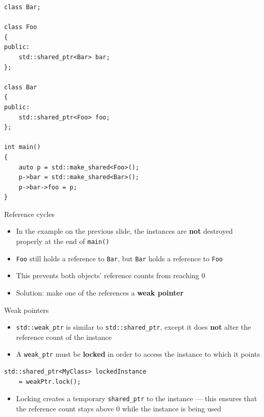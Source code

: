 \begin{frame}[fragile]
    \begin{lstlisting}
class Bar;

class Foo
{
public:
    std::shared_ptr<Bar> bar;
};

class Bar
{
public:
    std::shared_ptr<Foo> foo;
};

int main()
{
    auto p = std::make_shared<Foo>();
    p->bar = std::make_shared<Bar>();
    p->bar->foo = p;
}
    \end{lstlisting}
\end{frame}

\begin{frame}{Reference cycles}
    \begin{itemize}
        \item In the example on the previous slide,
            the instances are \textbf{not} destroyed properly at the end of \lstinline{main()} \pause
        \item \lstinline{Foo} still holds a reference to \lstinline{Bar},
            but \lstinline{Bar} holds a reference to \lstinline{Foo} \pause
        \item This prevents both objects' reference counts from reaching 0 \pause
        \item Solution: make one of the references a \textbf{weak pointer}
    \end{itemize}
\end{frame}

\begin{frame}[fragile]{Weak pointers}
    \begin{itemize}
        \item \lstinline{std::weak_ptr} is similar to \lstinline{std::shared_ptr},
            except it does \textbf{not} alter the reference count of the instance \pause
        \item A \lstinline{weak_ptr} must be \textbf{locked} in order to access the instance to which
            it points \pause
    \end{itemize}
    \begin{lstlisting}
std::shared_ptr<MyClass> lockedInstance
    = weakPtr.lock();
    \end{lstlisting} \pause
    \begin{itemize}
        \item Locking creates a temporary \lstinline{shared_ptr} to the instance ---
            this ensures that the reference count stays above 0 while the instance is being used
    \end{itemize}
\end{frame}

